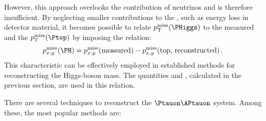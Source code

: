 However, this approach overlooks the contribution of neutrinos and is therefore insufficient. 
By neglecting smaller contributions to the \MET, such as energy loss in detector material, 
it becomes possible to relate $\pT^{\text{miss}}(\PHiggs)$ to the measured \MET and the 
$\pT^{\text{miss}}(\Ptop)$ by imposing the relation:
\begin{equation*}
    p^{\text{miss}}_{x,y}(\PH) = p^{\text{miss}}_{x,y}(\text{measured})
      - p^{\text{miss}}_{x,y}(\text{top, reconstructed})\,.
\end{equation*}
This characteristic can be effectively employed in established methods for reconstructing 
the Higgs-boson mass.
The quantities \pnutopT and \phinutop, calculated in the previous section, are used in this relation.

There are several techniques to reconstruct the $\Ptauon\APtauon$ system. Among these,
the most popular methods are:
